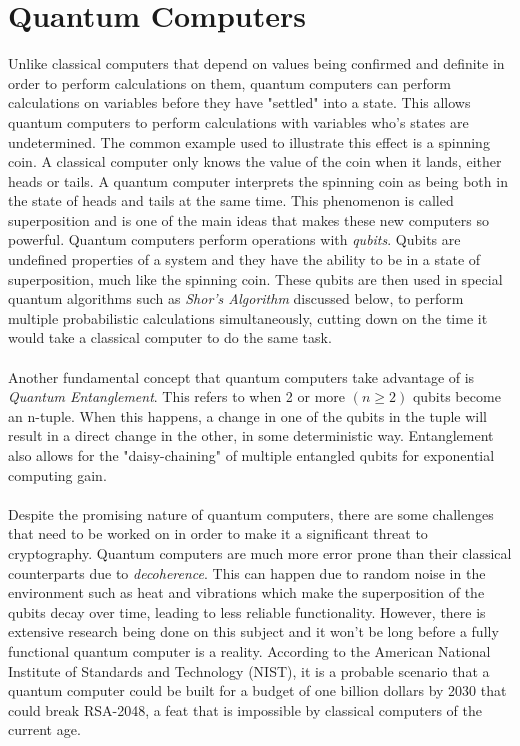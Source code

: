 \documentclass[journal]{IEEEtran}
\begin{document}
\section{Quantum Computers}
Unlike classical computers that depend on values being confirmed and definite in order to perform calculations on them, quantum computers can perform calculations 
on variables before they have "settled" into  a state. This allows quantum computers to perform calculations with variables who’s states are undetermined. 
The common example used to illustrate this effect is a spinning coin. A classical computer only knows the value of the coin when it lands, either heads or tails. 
A quantum computer interprets the spinning coin as being both in the state of heads and tails at the same time. 
This phenomenon is called superposition and is one of the main ideas that makes these new computers so powerful. Quantum computers perform operations with \emph{qubits}. 
Qubits are undefined properties of a system and they have the ability to be in a state of superposition, much like the spinning coin. These qubits are then used in special quantum algorithms such as 
\emph{Shor's Algorithm} discussed below, to perform multiple probabilistic calculations simultaneously, cutting down on the time it would take a classical computer to do the same task. \\ \\ 
Another fundamental concept that quantum computers take advantage of is \emph{Quantum Entanglement}. This refers to when 2 or more $(n \geq 2)$ qubits become an n-tuple. When this happens, 
a change in one of the qubits in the tuple will result in a direct change in the other, in some deterministic way. Entanglement also allows for the "daisy-chaining" of multiple entangled qubits 
for exponential computing gain. \\ \\ 
Despite the promising nature of quantum computers, there are some challenges that need to be worked on in order to make it a significant threat to cryptography. 
Quantum computers are much more error prone than their classical counterparts due to \emph{decoherence}. This can happen due to random noise in the environment such as 
heat and vibrations which make the superposition of the qubits decay over time, leading to less reliable functionality. 
However, there is extensive research being done on this subject and it won't be long before a fully functional quantum computer is a reality. 
According to the American National Institute of Standards and Technology (NIST), it is a probable scenario that a quantum computer could be built for a budget of 
one billion dollars by 2030 that could break RSA-2048, a feat that is impossible by classical computers of the current age. 
\end{document}
